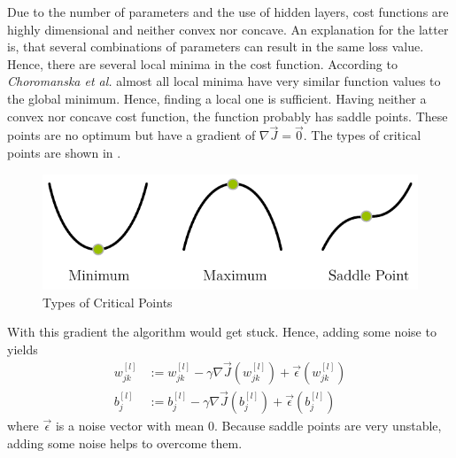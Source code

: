 Due to the number of parameters and the use of hidden layers, cost functions are highly dimensional and neither convex nor concave.
An explanation for the latter is, that several combinations of parameters can result in the same loss value.
Hence, there are several local minima in the cost function.
According to \textit{Choromanska et al.}\cite{DBLP:journals/corr/ChoromanskaHMAL14} almost all local minima have very similar function values to the global minimum.
Hence, finding a local one is sufficient.
Having neither a convex nor concave cost function, the function probably has saddle points.
These points are no optimum but have a gradient of $\nabla \vec{J} = \vec{0}$.
The types of critical points are shown in .
\begin{figure}
	\centering
	\includegraphics[]{images/gradient_descent_types.pdf}
	\caption{Types of Critical Points}
	\label{fig:critical-points}
\end{figure}
With this gradient the algorithm would get stuck.
Hence, adding some noise to  yields
\begin{subequations}
	\begin{align}
		w^{[l]}_{jk} &:= w^{[l]}_{jk} - \gamma \nabla \vec{J}(w^{[l]}_{jk}) + \vec{\epsilon}(w^{[l]}_{jk}) \\
		b^{[l]}_j &:= b^{[l]}_j - \gamma \nabla \vec{J}(b^{[l]}_j) + \vec{\epsilon}(b^{[l]}_j)
	\end{align}
\end{subequations}
where $\vec{\epsilon}$ is a noise vector with mean 0.
Because saddle points are very unstable, adding some noise helps to overcome them.